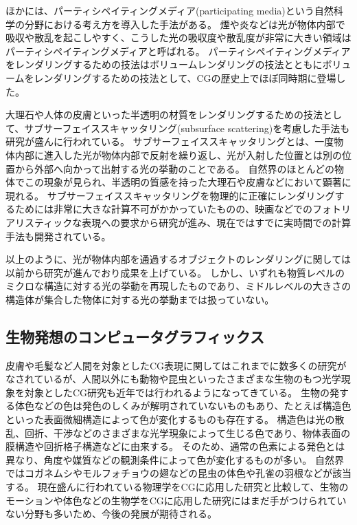 ほかには、パーティシペイティングメディア(participating media)という自然科学の分野における考え方を導入した手法がある。
煙や炎などは光が物体内部で吸収や散乱を起こしやすく、こうした光の吸収度や散乱度が非常に大きい領域はパーティシペイティングメディアと呼ばれる。
パーティシペイティングメディアをレンダリングするための技法はボリュームレンダリングの技法とともにボリュームをレンダリングするための技法として、CGの歴史上でほぼ同時期に登場した\cite{}。

大理石や人体の皮膚といった半透明の材質をレンダリングするための技法として、サブサーフェイススキャッタリング(subsurface scattering)を考慮した手法も研究が盛んに行われている。
サブサーフェイススキャッタリングとは、一度物体内部に進入した光が物体内部で反射を繰り返し、光が入射した位置とは別の位置から外部へ向かって出射する光の挙動のことである。
自然界のほとんどの物体でこの現象が見られ、半透明の質感を持った大理石や皮膚などにおいて顕著に現れる。
サブサーフェイススキャッタリングを物理的に正確にレンダリングするためには非常に大きな計算不可がかかっていたものの、映画などでのフォトリアリスティックな表現への要求から研究が進み、現在ではすでに実時間での計算手法も開発されている\cite{}。

以上のように、光が物体内部を通過するオブジェクトのレンダリングに関しては以前から研究が進んでおり成果を上げている。
しかし、いずれも物質レベルのミクロな構造に対する光の挙動を再現したものであり、ミドルレベルの大きさの構造体が集合した物体に対する光の挙動までは扱っていない。

\subsection{生物発想のコンピュータグラフィックス}

皮膚や毛髪など人間を対象としたCG表現に関してはこれまでに数多くの研究がなされているが\cite{}、人間以外にも動物や昆虫といったさまざまな生物のもつ光学現象を対象としたCG研究も近年では行われるようになってきている。
生物の発する体色などの色は発色のしくみが解明されていないものもあり、たとえば構造色といった表面微細構造によって色が変化するものも存在する。
構造色は光の散乱、回折、干渉などのさまざまな光学現象によって生じる色であり、物体表面の膜構造や回折格子構造などに由来する。
そのため、通常の色素による発色とは異なり、角度や媒質などの観測条件によって色が変化するものが多い。
自然界ではコガネムシやモルフォチョウの翅などの昆虫の体色や孔雀の羽根などが該当する。
現在盛んに行われている物理学をCGに応用した研究と比較して、生物のモーションや体色などの生物学をCGに応用した研究にはまだ手がつけられていない分野も多いため、今後の発展が期待される。

